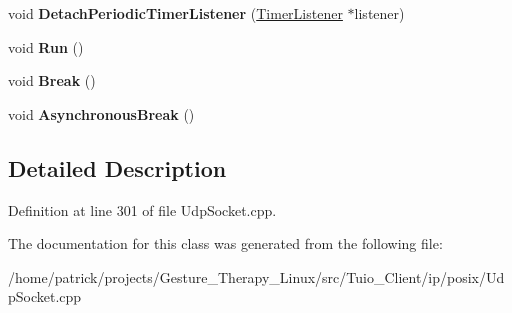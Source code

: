 \begin{DoxyCompactItemize}
\item 
\mbox{\label{class_socket_receive_multiplexer_1_1_implementation_a2357bf2e75148272bc42b3bc1c2ea2df}} 
void {\bfseries Detach\+Periodic\+Timer\+Listener} (\hyperlink{class_timer_listener}{Timer\+Listener} $\ast$listener)
\item 
\mbox{\label{class_socket_receive_multiplexer_1_1_implementation_a80492ed1e96059dd605e699989bffa1a}} 
void {\bfseries Run} ()
\item 
\mbox{\label{class_socket_receive_multiplexer_1_1_implementation_a4afe74ecc1e52d4ae8d30af6bb7c8d7f}} 
void {\bfseries Break} ()
\item 
\mbox{\label{class_socket_receive_multiplexer_1_1_implementation_a9fb12230b5f336d6a4720dac988b663d}} 
void {\bfseries Asynchronous\+Break} ()
\end{DoxyCompactItemize}


\subsection{Detailed Description}


Definition at line 301 of file Udp\+Socket.\+cpp.



The documentation for this class was generated from the following file\+:\begin{DoxyCompactItemize}
\item 
/home/patrick/projects/\+Gesture\+\_\+\+Therapy\+\_\+\+Linux/src/\+Tuio\+\_\+\+Client/ip/posix/Udp\+Socket.\+cpp\end{DoxyCompactItemize}
